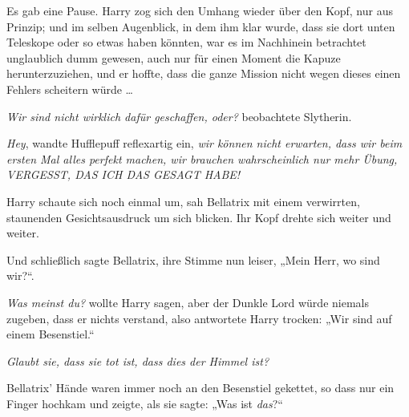 Es gab eine Pause. Harry zog sich den Umhang wieder über den Kopf, nur aus Prinzip; und im selben Augenblick, in dem ihm klar wurde, dass sie dort unten Teleskope oder so etwas haben könnten, war es im Nachhinein betrachtet unglaublich dumm gewesen, auch nur für einen Moment die Kapuze herunterzuziehen, und er hoffte, dass die ganze Mission nicht wegen dieses einen Fehlers scheitern würde …

\emph{Wir sind nicht wirklich dafür geschaffen, oder?} beobachtete Slytherin.

\emph{Hey}, wandte Hufflepuff reflexartig ein, \emph{wir können nicht erwarten, dass wir beim ersten Mal alles perfekt machen, wir brauchen wahrscheinlich nur mehr Übung, VERGESST, DAS ICH DAS GESAGT HABE!}

Harry schaute sich noch einmal um, sah Bellatrix mit einem verwirrten, staunenden Gesichtsausdruck um sich blicken. Ihr Kopf drehte sich weiter und weiter.

Und schließlich sagte Bellatrix, ihre Stimme nun leiser,
„Mein Herr, wo sind wir?“.

\emph{Was meinst du?} wollte Harry sagen, aber der Dunkle Lord würde niemals zugeben, dass er nichts verstand, also antwortete Harry trocken:
„Wir sind auf einem Besenstiel.“

\emph{Glaubt sie, dass sie tot ist, dass dies der Himmel ist?}

Bellatrix’ Hände waren immer noch an den Besenstiel gekettet, so dass nur ein Finger hochkam und zeigte, als sie sagte:
„Was ist \emph{das}?“

